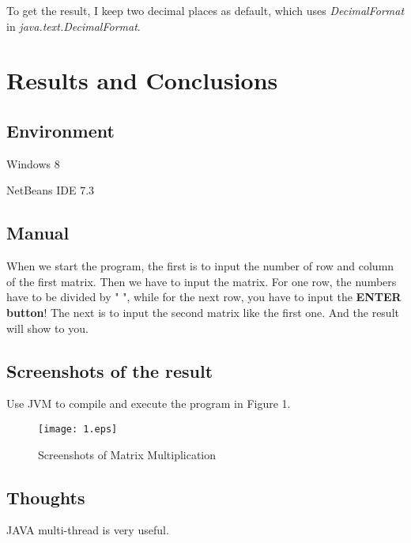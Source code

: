 \documentclass{article}
\begin{document}
To get the result, I keep two decimal places as default, which uses \emph{DecimalFormat} in \emph{java.text.DecimalFormat}.


\section{Results and Conclusions}
\subsection{Environment}
\begin{compactitem}
\item Windows 8
\item NetBeans IDE 7.3
\end{compactitem}
\subsection{Manual}
When we start the program, the first is to input the number of row and column of the first matrix. Then we have to input the matrix. For one row, the numbers have to be divided by " ", while for the next row, you have to input the \textbf{ENTER button}! The next is to input the second matrix like the first one. And the result will show to you.
\subsection{Screenshots of the result}
Use JVM to compile and execute the program in Figure 1.
\begin{figure}[h]
\centering
\texttt{[image: 1.eps]}
\caption{Screenshots of Matrix Multiplication}
\end{figure}

\subsection{Thoughts}
JAVA multi-thread is very useful.

\end{document}
